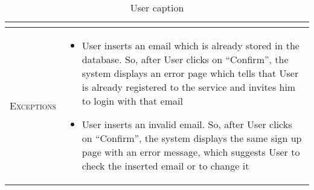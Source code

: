 \begin{table}[H]
\begin{tabular}[c]{|l|p{}|}
\begin{itemize}
    	\end{itemize}\\
    	\hline %
    	\textsc{Exceptions}         &  \begin{itemize}
    	    \item User inserts an email which is already stored in the database. So, after User clicks on “Confirm”, the system displays an error page which tells that User is already registered to the service and invites him to login with that email
            \item User inserts an invalid email. So, after User clicks on “Confirm”, the system displays the same sign up page with an error message, which suggests User to check the inserted email or to change it

    	\end{itemize}\\
    	\hline %
        
    \end{tabular}
    \caption{\label{tab:responsible_area_insertion}User caption }
\end{table}